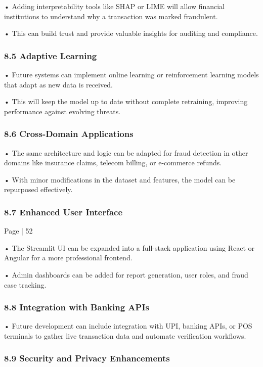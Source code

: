 \documentclass[11pt,a4paper]{article}
\begin{document}
• 
Adding interpretability tools like SHAP or LIME will allow financial institutions to 
understand why a transaction was marked fraudulent. 

• 
This can build trust and provide valuable insights for auditing and compliance. 

\subsubsection*{8.5 Adaptive Learning }

• 
Future systems can implement online learning or reinforcement learning models that adapt 
as new data is received. 

• 
This will keep the model up to date without complete retraining, improving performance 
against evolving threats. 

\subsubsection*{8.6 Cross-Domain Applications }

• 
The same architecture and logic can be adapted for fraud detection in other domains like 
insurance claims, telecom billing, or e-commerce refunds. 

• 
With minor modifications in the dataset and features, the model can be repurposed 
effectively. 

\subsubsection*{8.7 Enhanced User Interface }

Page | 52  

\newpage

• 
The Streamlit UI can be expanded into a full-stack application using React or Angular for a 
more professional frontend. 

• 
Admin dashboards can be added for report generation, user roles, and fraud case tracking. 

\subsubsection*{8.8 Integration with Banking APIs }

• 
Future development can include integration with UPI, banking APIs, or POS terminals to 
gather live transaction data and automate verification workflows. 

\subsubsection*{8.9 Security and Privacy Enhancements }
\end{document}
